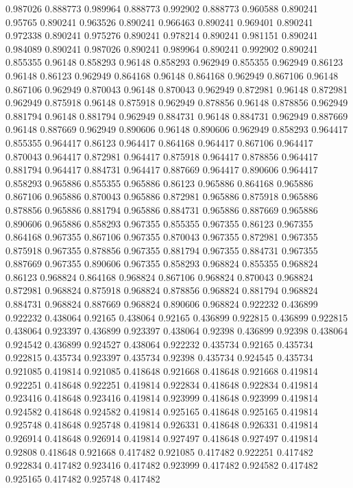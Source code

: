 0.987026 0.888773
0.989964 0.888773
0.992902 0.888773
0.960588 0.890241
0.95765 0.890241
0.963526 0.890241
0.966463 0.890241
0.969401 0.890241
0.972338 0.890241
0.975276 0.890241
0.978214 0.890241
0.981151 0.890241
0.984089 0.890241
0.987026 0.890241
0.989964 0.890241
0.992902 0.890241
0.855355 0.96148
0.858293 0.96148
0.858293 0.962949
0.855355 0.962949
0.86123 0.96148
0.86123 0.962949
0.864168 0.96148
0.864168 0.962949
0.867106 0.96148
0.867106 0.962949
0.870043 0.96148
0.870043 0.962949
0.872981 0.96148
0.872981 0.962949
0.875918 0.96148
0.875918 0.962949
0.878856 0.96148
0.878856 0.962949
0.881794 0.96148
0.881794 0.962949
0.884731 0.96148
0.884731 0.962949
0.887669 0.96148
0.887669 0.962949
0.890606 0.96148
0.890606 0.962949
0.858293 0.964417
0.855355 0.964417
0.86123 0.964417
0.864168 0.964417
0.867106 0.964417
0.870043 0.964417
0.872981 0.964417
0.875918 0.964417
0.878856 0.964417
0.881794 0.964417
0.884731 0.964417
0.887669 0.964417
0.890606 0.964417
0.858293 0.965886
0.855355 0.965886
0.86123 0.965886
0.864168 0.965886
0.867106 0.965886
0.870043 0.965886
0.872981 0.965886
0.875918 0.965886
0.878856 0.965886
0.881794 0.965886
0.884731 0.965886
0.887669 0.965886
0.890606 0.965886
0.858293 0.967355
0.855355 0.967355
0.86123 0.967355
0.864168 0.967355
0.867106 0.967355
0.870043 0.967355
0.872981 0.967355
0.875918 0.967355
0.878856 0.967355
0.881794 0.967355
0.884731 0.967355
0.887669 0.967355
0.890606 0.967355
0.858293 0.968824
0.855355 0.968824
0.86123 0.968824
0.864168 0.968824
0.867106 0.968824
0.870043 0.968824
0.872981 0.968824
0.875918 0.968824
0.878856 0.968824
0.881794 0.968824
0.884731 0.968824
0.887669 0.968824
0.890606 0.968824
0.922232 0.436899
0.922232 0.438064
0.92165 0.438064
0.92165 0.436899
0.922815 0.436899
0.922815 0.438064
0.923397 0.436899
0.923397 0.438064
0.92398 0.436899
0.92398 0.438064
0.924542 0.436899
0.924527 0.438064
0.922232 0.435734
0.92165 0.435734
0.922815 0.435734
0.923397 0.435734
0.92398 0.435734
0.924545 0.435734
0.921085 0.419814
0.921085 0.418648
0.921668 0.418648
0.921668 0.419814
0.922251 0.418648
0.922251 0.419814
0.922834 0.418648
0.922834 0.419814
0.923416 0.418648
0.923416 0.419814
0.923999 0.418648
0.923999 0.419814
0.924582 0.418648
0.924582 0.419814
0.925165 0.418648
0.925165 0.419814
0.925748 0.418648
0.925748 0.419814
0.926331 0.418648
0.926331 0.419814
0.926914 0.418648
0.926914 0.419814
0.927497 0.418648
0.927497 0.419814
0.92808 0.418648
0.921668 0.417482
0.921085 0.417482
0.922251 0.417482
0.922834 0.417482
0.923416 0.417482
0.923999 0.417482
0.924582 0.417482
0.925165 0.417482
0.925748 0.417482

